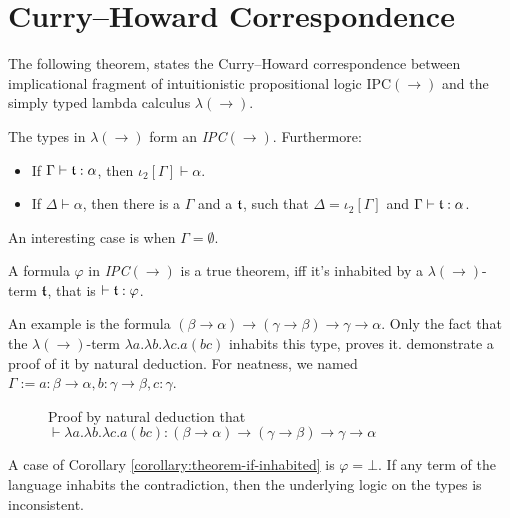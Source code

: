 \section{Curry--Howard Correspondence}

The following theorem, states the Curry--Howard correspondence between implicational fragment of intuitionistic propositional logic IPC$(\rightarrow)$ and the simply typed lambda calculus $\lambda(\rightarrow)$.

\begin{theorem}
The types in $\lambda(\rightarrow)$ form an \emph{IPC}$(\rightarrow)$. Furthermore:
\begin{itemize}
    \item If $\Gamma \vdash \mathfrak{t} : \alpha$, then $\iota_2[\Gamma] \vdash \alpha$.
    \item If $\Delta \vdash \alpha$, then there is a $\Gamma$ and a $\mathfrak{t}$, such that $\Delta = \iota_2[\Gamma]$ and $\Gamma \vdash \mathfrak{t} : \alpha$.
\end{itemize}
\end{theorem}

An interesting case is when $\Gamma = \emptyset$.

\begin{corollary}
\label{corollary:theorem-if-inhabited}
A formula $\varphi$ in \emph{IPC}$(\rightarrow)$ is a true theorem, iff it's inhabited by a $\lambda(\rightarrow)$-term $\mathfrak{t}$, that is $\vdash \mathfrak{t} : \varphi$.
\end{corollary}

An example is the formula $(\beta \rightarrow \alpha) \rightarrow (\gamma \rightarrow \beta) \rightarrow \gamma \rightarrow \alpha$. Only the fact that the $\lambda(\rightarrow)$-term $\lambda a. \lambda b. \lambda c. a (b c)$ inhabits this type, proves it.  demonstrate a proof of it by natural deduction. For neatness, we named $\Gamma := a : \beta \rightarrow \alpha, b : \gamma \rightarrow \beta, c : \gamma$.

\begin{figure}
    \centering
    
    \caption{Proof by natural deduction that $\vdash \lambda a. \lambda b. \lambda c. a (b c) : (\beta \rightarrow \alpha) \rightarrow (\gamma \rightarrow \beta) \rightarrow \gamma \rightarrow \alpha$}
    \label{fig:curry-howard-example}
\end{figure}

A case of Corollary \ref{corollary:theorem-if-inhabited} is $\varphi = \bot$. If any term of the language inhabits the contradiction, then the underlying logic on the types is inconsistent.